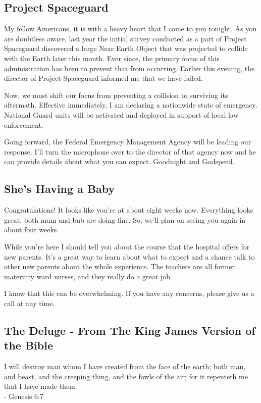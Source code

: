 \documentclass[12pt, a5paper, parskip=half-, footheight=1.4cm]{scrartcl}
\begin{document}
\newpage

\subsection*{Project Spaceguard} \label{subsection:project-spaceguard}
My fellow Americans, it is with a heavy heart that I come to you tonight. 
As you are doubtless aware, last year the initial survey conducted as a part of Project Spaceguard discovered a large Near Earth Object that was projected to collide with the Earth later this month.
Ever since, the primary focus of this administration has been to prevent that from occurring. Earlier this evening, the director of Project Spaceguard informed me that we have failed.

Now, we must shift our focus from preventing a collision to surviving its aftermath.
Effective immediately, I am declaring a nationwide state of emergency. 
National Guard units will be activated and deployed in support of local law enforcement. 

Going forward, the Federal Emergency Management Agency will be leading our response.
I'll turn the microphone over to the director of that agency now and he can provide details about what you can expect.
Goodnight and Godspeed.


\subsection*{She's Having a Baby} \label{subsection:shes-having-a-baby}
Congratulations! It looks like you're at about eight weeks now.
Everything looks great, both mum and bub are doing fine. 
So, we'll plan on seeing you again in about four weeks.

While you're here I should tell you about the course that the hospital offers for new parents.
It's a great way to learn about what to expect and a chance talk to other new parents about the whole experience. 
The teachers are all former maternity ward nurses, and they really do a great job.

I know that this can be overwhelming.
If you have any concerns, please give us a call at any time. 

\newpage

\subsection*{The Deluge \setmainfont{URWClassico}- From The King James Version of the Bible} \label{subsection:the-deluge}
I will destroy man whom I have created from the face of the earth; both man, and beast, and the creeping thing, and the fowls of the air; for it repenteth me that I have made them.\\ 
\vspace{0.5ex}\hspace{8cm} - Genesis 6:7
\end{document}
